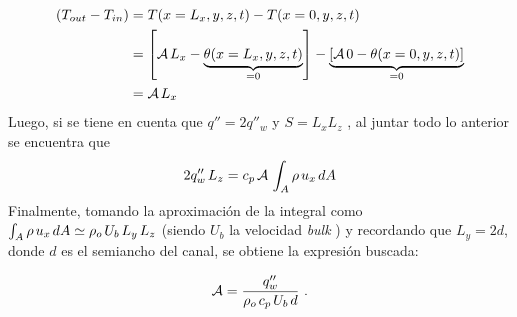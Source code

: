 \begin{equation*}
\begin{aligned}
\left( T_{out} - T_{in} \right) &= T(x=L_x,y,z,t) - T(x=0,y,z,t) \\
								&= \left[ \mathcal{A} \hspace{0.5mm} L_x - \underbrace{\theta(x=L_x,y,z,t)}_{=0} \right] - \underbrace{ \left[ \mathcal{A} \hspace{0.5mm} 0 - \theta(x=0,y,z,t) \right] }_{=0} \\
								&= \mathcal{A} \hspace{0.5mm} L_x
\end{aligned}
\end{equation*}
Luego, si se tiene en cuenta que $q''= 2 q''_w$ y  $S=L_x L_z$ , al juntar todo lo anterior se encuentra que 
$$ 2 q''_w \hspace{0.5mm} L_z = c_p \hspace{0.5mm} \mathcal{A}  \hspace{0.5mm} \int_A  \rho \hspace{0.5mm} u_x \hspace{0.5mm} dA $$
Finalmente, tomando la aproximación de la integral como  $ \int_A \rho \hspace{0.5mm} u_x  \hspace{0.5mm} dA \simeq \rho_o \hspace{0.5mm} U_b \hspace{0.5mm} L_y \hspace{0.5mm} L_z$  (siendo $U_b$ la velocidad \textit{bulk} \cite{pope2001turbulent}) y recordando que $L_y = 2 d$, donde $d$ es el semiancho del canal, se obtiene la expresión buscada:

\begin{equation}
\mathcal{A}=\frac{q''_w}{\rho_o \hspace{0.5mm} c_p \hspace{0.5mm} U_b \hspace{0.5mm} d } \text{ .}
\end{equation}

